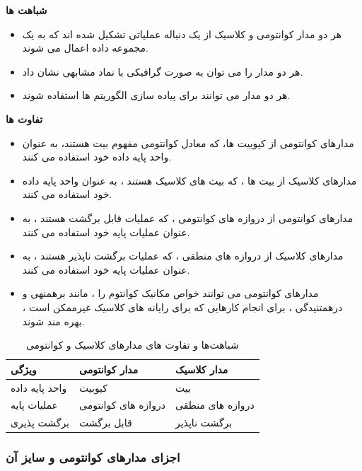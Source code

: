\documentclass{book}
\begin{document}
\textbf{شباهت ها}

\begin{itemize}
	\item هر دو مدار کوانتومی و کلاسیک از یک دنباله عملیاتی تشکیل شده اند که به یک مجموعه داده اعمال می شوند.
	\item هر دو مدار را می توان به صورت گرافیکی با نماد مشابهی نشان داد.
	\item هر دو مدار می توانند برای پیاده سازی الگوریتم ها استفاده شوند.
\end{itemize}

\textbf{تفاوت ها}

\begin{itemize}
	\item مدارهای کوانتومی از کیوبیت ها، که معادل کوانتومی مفهوم بیت هستند، به عنوان واحد پایه داده خود استفاده می کنند. 
	\item مدارهای کلاسیک از بیت ها ، که بیت های کلاسیک هستند ، به عنوان واحد پایه داده خود استفاده می کنند.
	\item مدارهای کوانتومی از دروازه های کوانتومی ، که عملیات قابل برگشت هستند ، به عنوان عملیات پایه خود استفاده می کنند.
	\item  مدارهای کلاسیک از دروازه های منطقی ، که عملیات برگشت ناپذیر هستند ، به عنوان عملیات پایه خود استفاده می کنند.
	\item مدارهای کوانتومی می توانند خواص مکانیک کوانتوم را ، مانند برهمنهی و درهمتنیدگی ، برای انجام کارهایی که برای رایانه های کلاسیک غیرممکن است ، بهره مند شوند.
\end{itemize}


\renewcommand{\arraystretch}{1.5}
\begin{table}[ht]
	\centering
	\begin{tabular}[5pt]{|p{100pt}|p{100pt}|p{100pt}|}
		\hline
		\textbf{ویژگی} & \textbf{مدار کوانتومی} &\textbf{مدار کلاسیک} \\
		\hline
		واحد پایه داده & کیوبیت & بیت \\
		\hline
	      عملیات پایه & دروازه های کوانتومی & دروازه های منطقی \\
		\hline
		برگشت پذیری & قابل برگشت & برگشت ناپذیر \\
		\hline
	\end{tabular}
	\caption{شباهت‌ها و تفاوت های مدارهای کلاسیک و کوانتومی}
\end{table}



\subsubsection{اجزای مدار‌های کوانتومی و سایز آن }
\end{document}
